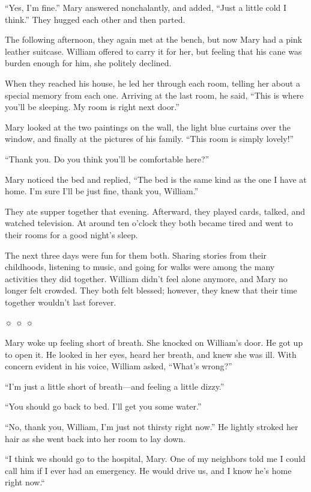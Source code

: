 “Yes, I'm fine.” Mary answered nonchalantly, and added, “Just a little cold I think.” They hugged each other and then parted.

The following afternoon, they again met at the bench, but now Mary had a pink leather suitcase. William offered to carry it for her, but feeling that his cane was burden enough for him, she politely declined.

When they reached his house, he led her through each room, telling her about a special memory from each one. Arriving at the last room, he said, “This is where you'll be sleeping. My room is right next door.”

Mary looked at the two paintings on the wall, the light blue curtains over the window, and finally at the pictures of his family. “This room is simply lovely!”

“Thank you. Do you think you'll be comfortable here?”

Mary noticed the bed and replied, “The bed is the same kind as the one I have at home. I'm sure I'll be just fine, thank you, William.”

They ate supper together that evening. Afterward, they played cards, talked, and watched television. At around ten o'clock they both became tired and went to their rooms for a good night's sleep.

The next three days were fun for them both. Sharing stories from their childhoods, listening to music, and going for walks were among the many activities they did together. William didn't feel alone anymore, and Mary no longer felt crowded. They both felt blessed; however, they knew that their time together wouldn't last forever.



☼ ☼ ☼



Mary woke up feeling short of breath. She knocked on William's door. He got up to open it. He looked in her eyes, heard her breath, and knew she was ill. With concern evident in his voice, William asked, “What's wrong?”

“I'm just a little short of breath—and feeling a little dizzy.”

“You should go back to bed. I'll get you some water.”

“No, thank you, William, I'm just not thirsty right now.” He lightly stroked her hair as she went back into her room to lay down.

“I think we should go to the hospital, Mary. One of my neighbors told me I could call him if I ever had an emergency. He would drive us, and I know he's home right now.“

